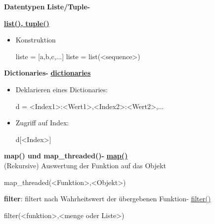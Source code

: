 \documentclass[a4paper,9pt,DIV15,twocolumn]{scrartcl}
\begin{document}
\textbf{Datentypen}
\textbf{Liste/Tuple-} 	{\href{http://docs.python.org/library/functions.html#list}{\textbf{list(),} } \href{http://docs.python.org/library/functions.html#tuple}{\textbf{tuple()}}
\begin{itemize}
 \item Konstruktion
\begin{sagein}
liste = [a,b,c,...] 
liste = list(<sequence>)
\end{sagein}
\end{itemize}
\bigskip
\bigskip
\bigskip
\bigskip
\textbf{Dictionaries- }		\href{http://docs.python.org/library/stdtypes.html?highlight=.update#mapping-types-dict}{\textbf{dictionaries}}
\begin{itemize}
 \item Deklarieren eines Dictionaries:
\begin{sagein}
d = {<Index1>:<Wert1>,<Index2>:<Wert2>,...}
\end{sagein}
 \item Zugriff auf Index:
\begin{sagein}
d[<Index>]
\end{sagein}
\end{itemize}

\textbf{map() und map\_threaded()- } \href{https://sage.math.uni-goettingen.de/doc/static/reference/sage/combinat/generator.html?highlight=map#sage.combinat.generator.map}{\textbf{map()}\\}
(Rekursive) Auswertung der Funktion auf das Objekt
\begin{sagein}
 map_threaded(<Funktion>,<Objekt>)
\end{sagein}

\textbf{filter}: filtert nach Wahrheitswert der übergebenen Funktion- \href{https://sage.math.uni-goettingen.de/doc/static/reference/sage/combinat/combinat.html?highlight=filter#sage.combinat.combinat.CombinatorialClass.filter}{filter()}
\begin{sagein}
filter(<funktion>,<menge oder Liste>)
\end{sagein}

}
\end{document}
